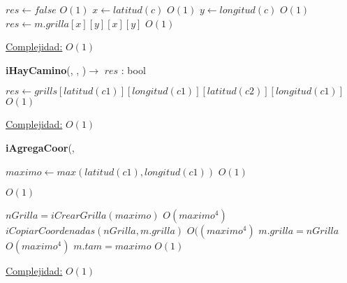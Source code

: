 \begin{Algoritmos}
\begin{algorithm}[H]
\begin{algorithmic}[1]
	\State $res \gets false$ \Comment $O(1)$
\Else
	\State $x \gets latitud(c)$ \Comment $O(1)$
	\State $y \gets longitud(c)$ \Comment $O(1)$
	\State $res \gets m.grilla[x][y][x][y]$ \Comment $O(1)$
\EndIf


\medskip
\Statex \underline{Complejidad:} $O(1)$


\end{algorithmic}
\end{algorithm}


\begin{algorithm}[H]
{\textbf{iHayCamino}(, , )$\to$ $res$ : bool}
\begin{algorithmic}[1]

\State $res \gets grills[latitud(c1)][longitud(c1)][latitud(c2)][longitud(c1)]$ \Comment $O(1)$

\medskip
\Statex \underline{Complejidad:} $O(1)$


\end{algorithmic}
\end{algorithm}




\begin{algorithm}[H]
{\textbf{iAgregaCoor}(, }
\begin{algorithmic}[1]

\State $maximo \gets max(latitud(c1), longitud(c1)) $ \Comment $O(1)$

\State {} \Comment $O(1)$

\State $nGrilla = iCrearGrilla(maximo)$ \Comment $O(maximo^4)$
\State $iCopiarCoordenadas(nGrilla, m.grilla)$ \Comment $O((maximo^4)$
\State $m.grilla = nGrilla$ \Comment $O(maximo^4)$
\State $m.tam = maximo$ \Comment $O(1)$

\EndIf


\medskip
\Statex \underline{Complejidad:} $O(1)$


\end{algorithmic}
\end{algorithm}




  
\end{Algoritmos}